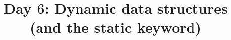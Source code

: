 \documentclass{article}
\begin{document}
\title{Day 6: Dynamic data structures (and the static keyword)}
\date{}
\maketitle


\end{document}
